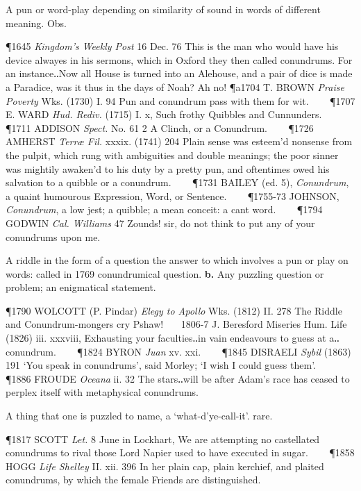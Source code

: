 \begin{description}[wide, labelwidth=!, labelindent=0pt]
\begin{myenumerate}
 A pun or word-play depending on similarity of sound in words of different meaning. Obs.

\P 1645 \textit{Kingdom's  Weekly Post} 16 Dec. 76 This is the man who would have his device alwayes in his sermons, which in Oxford they then called conundrums. For an instance‥Now all House is turned into an Alehouse, and a pair of dice is made a Paradice, was it thus in the days of Noah? Ah no!
\P a1704 T. BROWN  \textit{Praise Poverty} Wks. (1730) I. 94 Pun and conundrum pass with them for wit.    
\P 1707 E. WARD  \textit{Hud. Rediv.} (1715) I. x, Such frothy Quibbles and Cunnunders.    
\P 1711 ADDISON  \textit{Spect.} No. 61 2 A Clinch, or a Conundrum.    
\P 1726 AMHERST  \textit{Terræ Fil.} xxxix. (1741) 204 Plain sense was esteem'd nonsense from the pulpit, which rung with ambiguities and double meanings; the poor sinner was mightily awaken'd to his duty by a pretty pun, and oftentimes owed his salvation to a quibble or a conundrum.    
\P 1731 BAILEY  (ed. 5), \textit{Conundrum}, a quaint humourous Expression, Word, or Sentence.    
\P 1755-73 JOHNSON,  \textit{Conundrum}, a low jest; a quibble; a mean conceit: a cant word.    
\P 1794 GODWIN  \textit{Cal. Williams} 47 Zounds! sir, do not think to put any of your conundrums upon me.

 A riddle in the form of a question the answer to which involves a pun or play on words: called in 1769 conundrumical question. \textbf{b.} Any puzzling question or problem; an enigmatical statement. 

\P 1790 WOLCOTT  (P. Pindar) \textit{Elegy to Apollo} Wks. (1812) II. 278 The Riddle and Conundrum-mongers cry Pshaw!    1806-7 J. Beresford Miseries Hum. Life (1826) iii. xxxviii, Exhausting your faculties‥in vain endeavours to guess at a‥conundrum.    
\P 1824 BYRON  \textit{Juan} xv. xxi.    
\P 1845 DISRAELI  \textit{Sybil} (1863) 191 ‘You speak in conundrums’, said Morley; ‘I wish I could guess them’.    
\P 1886 FROUDE  \textit{Oceana} ii. 32 The stars‥will be after Adam's race has ceased to perplex itself with metaphysical conundrums.

 A thing that one is puzzled to name, a ‘what-d'ye-call-it’. rare.

\P 1817 SCOTT  \textit{Let.} 8 June in Lockhart, We are attempting no castellated conundrums to rival those Lord Napier used to have executed in sugar.    
\P 1858 HOGG  \textit{Life Shelley} II. xii. 396 In her plain cap, plain kerchief, and plaited conundrums, by which the female Friends are distinguished.


\end{myenumerate}
\end{description}
